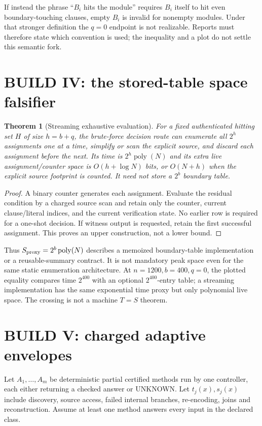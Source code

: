 \documentclass[11pt]{article}
\newtheorem{theorem}{Theorem}
\begin{document}
If instead the phrase ``$B_i$ hits the module'' requires $B_i$ itself to hit
even boundary-touching clauses, empty $B_i$ is invalid for nonempty modules.
Under that stronger definition the $q=0$ endpoint is not realizable.  Reports
must therefore state which convention is used; the inequality and a plot do
not settle this semantic fork.

\section{BUILD IV: the stored-table space falsifier}
\begin{theorem}[Streaming exhaustive evaluation]
For a fixed authenticated hitting set $H$ of size $h=b+q$, the brute-force
decision route can enumerate all $2^h$ assignments one at a time, simplify or
scan the explicit source, and discard each assignment before the next.  Its
time is $2^h\operatorname{poly}(N)$ and its extra live assignment/counter
space is $O(h+\log N)$ bits, or $O(N+h)$ when the explicit source footprint is
counted.  It need not store a $2^b$ boundary table.
\end{theorem}
\begin{proof}
A binary counter generates each assignment.  Evaluate the residual condition
by a charged source scan and retain only the counter, current clause/literal
indices, and the current verification state.  No earlier row is required for
a one-shot decision.  If witness output is requested, retain the first
successful assignment.  This proves an upper construction, not a lower bound.
\end{proof}

Thus $S_{\rm proxy}=2^b\operatorname{poly}(N)$ describes a memoized
boundary-table implementation or a reusable-summary contract.  It is not
mandatory peak space even for the same static enumeration architecture.  At
$n=1200,b=400,q=0$, the plotted equality compares time $2^{400}$ with an
optional $2^{400}$-entry table; a streaming implementation has the same
exponential time proxy but only polynomial live space.  The crossing is not a
machine $T=S$ theorem.

\section{BUILD V: charged adaptive envelopes}
Let $A_1,\ldots,A_m$ be deterministic partial certified methods run by one
controller, each either returning a checked answer or UNKNOWN.  Let
$t_j(x),s_j(x)$ include discovery, source access, failed internal branches,
re-encoding, joins and reconstruction.  Assume at least one method answers
every input in the declared class.
\end{document}
